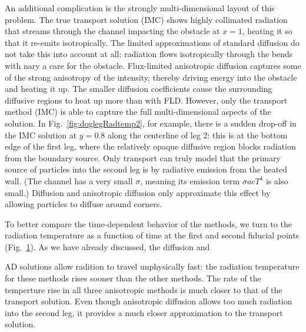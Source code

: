 An additional complication is the strongly multi-dimensional layout of this
problem. The true transport solution (IMC) shows highly collimated radiation
that streams through the channel impacting the obstacle at $x=1$, heating it
so that it re-emits isotropically. The limited approximations of standard
diffusion do not take this into
account at all: radiation flows isotropically through the bends with nary a care
for the obstacle. Flux-limited anisotropic diffusion captures some of the
strong anisotropy of the intensity, thereby driving energy into the obstacle and
heating it up. The smaller diffusion coefficients cause the surrounding
diffusive regions to heat up more than with FLD. However, only the transport
method (IMC) is able to capture the full multi-dimensional aspects of the
solution. In Fig.~\ref{fig:doglegRadtemp2}, for example, there is a sudden
drop-off in the IMC solution at $y=0.8$ along the centerline of leg 2: this is
at the bottom edge of the first leg, where the relatively opaque diffusive
region blocks radiation from the boundary source. Only transport can truly
model that the primary source of particles into the second leg is by radiative
emission from the heated wall. (The channel has a very small $\sigma$, meaning
its emission term $\sigma a c T^4$ is also small.) Diffusion and anisotropic
diffusion only approximate this effect by allowing particles to diffuse around
corners.

To better compare the time-dependent behavior of the methods, we turn to
the radiation temperature as a function of time at the first and second fiducial
points (Fig.~\ref{fig:doglegFiducial}). As we have already discussed, the
diffusion and
%
\begin{figure}[htb]
  \centering\small
  \subfloat[$x=0.9$, $y=1.0$]{%
    \hspace{-.25in}%
    
  }%
  \subfloat[$x=0.9$, $y=0.3$]{%
    \hspace{-.25in}%
    
  }%
  \label{fig:doglegFiducial}
\end{figure}
%
AD solutions allow radition to travel unphysically fast: the radiation
temperature for these methods rises sooner than the other methods. The rate of
the temperture rise in all three anisotropic methods is much closer to that of
the transport solution. Even though anisotropic diffusion allows too much
radiation into the second leg, it provides a much closer approximation to the
transport solution.

